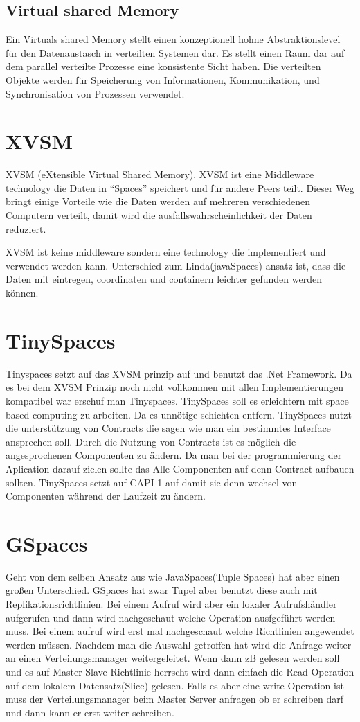 \documentclass[a4paper,12pt]{scrreprt}
\begin{document}
			\subsection{Virtual shared Memory}
				Ein Virtuals shared Memory stellt einen konzeptionell hohne Abstraktionslevel für den Datenaustasch in verteilten Systemen dar.  Es stellt einen Raum dar auf dem parallel verteilte Prozesse eine konsistente Sicht haben. Die verteilten Objekte werden für Speicherung von Informationen, Kommunikation, und Synchronisation von Prozessen verwendet.
		\section{XVSM}
		XVSM (eXtensible Virtual Shared Memory). XVSM ist eine Middleware technology die Daten in “Spaces” speichert  und für andere Peers teilt. Dieser Weg bringt einige Vorteile wie die Daten werden auf mehreren verschiedenen Computern verteilt, damit wird die ausfallswahrscheinlichkeit der Daten reduziert.
		
		XVSM ist keine middleware sondern eine technology die implementiert und verwendet werden kann.
		Unterschied zum Linda(javaSpaces) ansatz ist, dass die Daten mit eintregen, coordinaten und containern leichter gefunden werden können.
		
		
		\section{TinySpaces}
			Tinyspaces setzt auf das XVSM prinzip auf und benutzt das .Net Framework. Da es bei dem XVSM Prinzip noch nicht vollkommen mit allen Implementierungen kompatibel war erschuf man Tinyspaces. 
			TinySpaces soll es erleichtern mit space based computing zu arbeiten. Da es unnötige schichten entfern. 
			TinySpaces nutzt die unterstützung von Contracts die sagen wie man ein bestimmtes Interface ansprechen soll.
			Durch die Nutzung von Contracts ist es möglich die angesprochenen Componenten zu ändern. Da man bei der programmierung der Aplication darauf zielen sollte das Alle Componenten auf denn Contract aufbauen sollten.
			TinySpaces setzt auf CAPI-1 auf damit sie denn wechsel von Componenten während der Laufzeit zu ändern.
		\section{GSpaces}
		Geht von dem selben Ansatz aus wie JavaSpaces(Tuple Spaces) hat aber einen großen Unterschied. GSpaces hat zwar Tupel aber benutzt diese auch mit Replikationsrichtlinien.  Bei einem Aufruf wird aber ein lokaler Aufrufshändler aufgerufen und dann wird nachgeschaut welche Operation ausfgeführt werden muss. Bei  einem aufruf wird erst mal nachgeschaut welche Richtlinien angewendet werden müssen. Nachdem man die Auswahl getroffen hat wird die Anfrage weiter an einen Verteilungsmanager weitergeleitet.  Wenn dann zB gelesen werden soll und es auf Master-Slave-Richtlinie herrscht wird dann einfach die Read Operation auf dem lokalem Datensatz(Slice) gelesen. Falls es aber eine write Operation ist muss der Verteilungsmanager beim Master Server anfragen ob er schreiben darf und dann kann er erst weiter schreiben.	
	
\end{document}
